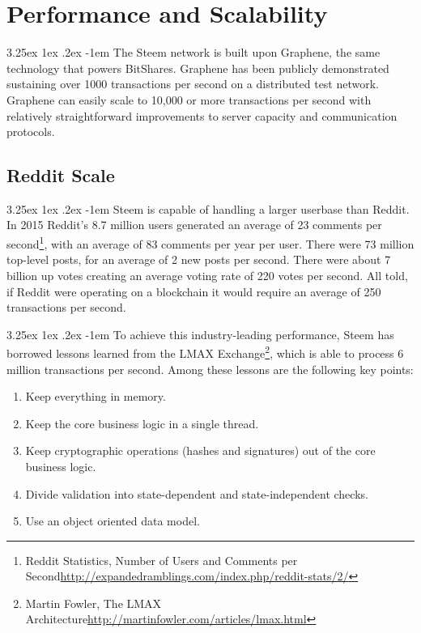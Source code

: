 \documentclass{article}
\makeatletter
\renewcommand\paragraph{\@startsection{paragraph}{5}{\z@}%
  {3.25ex \@plus1ex \@minus.2ex}%
  {-1em}%
  {\normalfont\normalsize\bfseries}}
\makeatother
\begin{document}
    \section{Performance and Scalability}

        \paragraph{}
            The Steem network is built upon Graphene, the same technology that powers BitShares. Graphene has been publicly demonstrated sustaining over 1000 transactions per second on a distributed test network. Graphene can easily scale to 10,000 or more transactions per second with relatively straightforward improvements to server capacity and communication protocols.

        \subsection{Reddit Scale}

            \paragraph{}
                Steem is capable of handling a larger userbase than Reddit. In 2015 Reddit's 8.7 million users generated an average of 23 comments per second\footnote{Reddit Statistics, Number of Users and Comments per Second\newline\url{http://expandedramblings.com/index.php/reddit-stats/2/}}, with an average of 83 comments per year per user. There were 73 million top-level posts, for an average of 2 new posts per second. There were about 7 billion up votes creating an average voting rate of 220 votes per second. All told, if Reddit were operating on a blockchain it would require an average of 250 transactions per second.

            \paragraph{}
                To achieve this industry-leading performance, Steem has borrowed lessons learned from the LMAX Exchange\footnote{Martin Fowler, The LMAX Architecture\newline\url{http://martinfowler.com/articles/lmax.html}}, which is able to process 6 million transactions per second. Among these lessons are the following key points:

            \begin{enumerate}
                \item Keep everything in memory.
                \item Keep the core business logic in a single thread.
                \item Keep cryptographic operations (hashes and signatures) out of the core business logic.
                \item Divide validation into state-dependent and state-independent checks.
                \item Use an object oriented data model.
            \end{enumerate}
\end{document}
